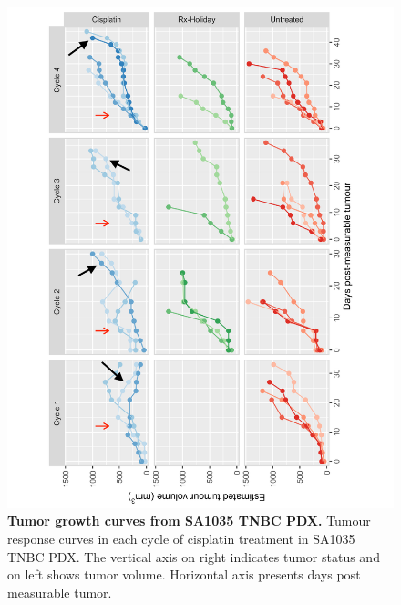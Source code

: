 \begin{figure}
\centering
\includegraphics[width=\textwidth]{Figures/SA1035_AllCyclesCisplatin.pdf}
	
\caption[Tumor growth curves from SA1035 TNBC PDX]
	{\small
\textbf{Tumor growth curves from SA1035 TNBC PDX.}
Tumour response curves in each cycle of cisplatin treatment in SA1035 TNBC PDX. The vertical axis on right indicates tumor status and on left shows tumor volume. Horizontal axis presents days post measurable tumor.
}
	\label{fig:SA1035_AllCyclesCisplatin}
\end{figure}


